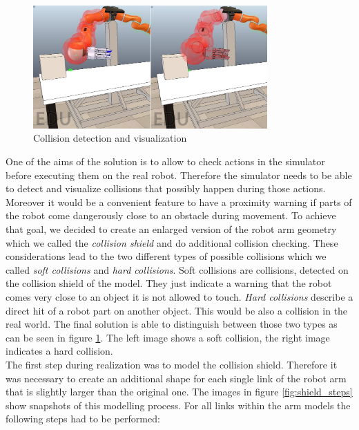\begin{figure}[h]
	\centering
  	\includegraphics[width=0.8\textwidth]{images/collision.jpg}
	\caption{Collision detection and visualization}
	\label{fig:collision}
\end{figure}

One of the aims of the solution is to allow to check actions in the simulator before executing them on the real robot. Therefore the simulator needs to be able to detect and visualize collisions that possibly happen during those actions. Moreover it would be a convenient feature to have a proximity warning if parts of the robot come dangerously close to an obstacle during movement. To achieve that goal, we decided to create an enlarged version of the robot arm geometry which we called the \emph{collision shield} and do additional collision checking. These considerations lead to the two different types of possible collisions which we called \emph{soft collisions} and \emph{hard collisions}. Soft collisions are collisions, detected on the collision shield of the model. They just indicate a warning that the robot comes very close to an object it is not allowed to touch. \emph{Hard collisions} describe a direct hit of a robot part on another object. This would be also a collision in the real world. The final solution is able to distinguish between those two types as can be seen in figure \ref{fig:collision}. The left image shows a soft collision, the right image indicates a hard collision.\\

The first step during realization was to model the collision shield. Therefore it was necessary to create an additional shape for each single link of the robot arm that is slightly larger than the original one. The images in figure \ref{fig:shield_steps} show snapshots of this modelling process. For all links within the arm models the following steps had to be performed:

